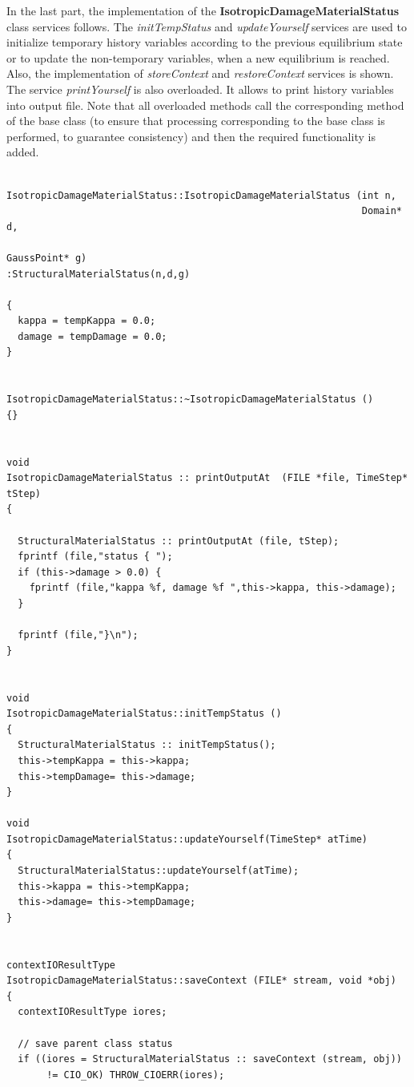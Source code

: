 \documentclass[a4paper]{article}
\newcommand{\class}[1]{{\bf #1}}
\newcommand{\service}[1]{{\em #1}}
\begin{document}
In the last part, the implementation of
the \class{IsotropicDamageMaterialStatus} class services follows. 
The \service{initTempStatus} and \service{updateYourself} services are 
used to initialize temporary history variables according to the previous
equilibrium state or to update the non-temporary variables, when a new
equilibrium is reached. Also, the implementation of
\service{storeContext} and \service{restoreContext} services is shown.
The service \service{printYourself} is also overloaded. It allows to print history variables
into output file.
Note that all overloaded methods call the corresponding method of the base
class (to ensure that processing corresponding to the base class is
performed, to guarantee consistency) and then the required functionality is added.


{\small
\begin{verbatim}

IsotropicDamageMaterialStatus::IsotropicDamageMaterialStatus (int n, 
                                                              Domain* d, 
                                                              GaussPoint* g)
:StructuralMaterialStatus(n,d,g)

{
  kappa = tempKappa = 0.0;
  damage = tempDamage = 0.0;
}


IsotropicDamageMaterialStatus::~IsotropicDamageMaterialStatus () 
{}


void 
IsotropicDamageMaterialStatus :: printOutputAt  (FILE *file, TimeStep* tStep)
{
  
  StructuralMaterialStatus :: printOutputAt (file, tStep);
  fprintf (file,"status { ");
  if (this->damage > 0.0) {
    fprintf (file,"kappa %f, damage %f ",this->kappa, this->damage);
  }
  
  fprintf (file,"}\n");
}
 

void 
IsotropicDamageMaterialStatus::initTempStatus ()
{
  StructuralMaterialStatus :: initTempStatus();
  this->tempKappa = this->kappa;
  this->tempDamage= this->damage;
}

void 
IsotropicDamageMaterialStatus::updateYourself(TimeStep* atTime)
{
  StructuralMaterialStatus::updateYourself(atTime);
  this->kappa = this->tempKappa;
  this->damage= this->tempDamage;
}


contextIOResultType
IsotropicDamageMaterialStatus::saveContext (FILE* stream, void *obj)
{
  contextIOResultType iores;

  // save parent class status
  if ((iores = StructuralMaterialStatus :: saveContext (stream, obj)) 
       != CIO_OK) THROW_CIOERR(iores);


\end{verbatim}}
\end{document}
